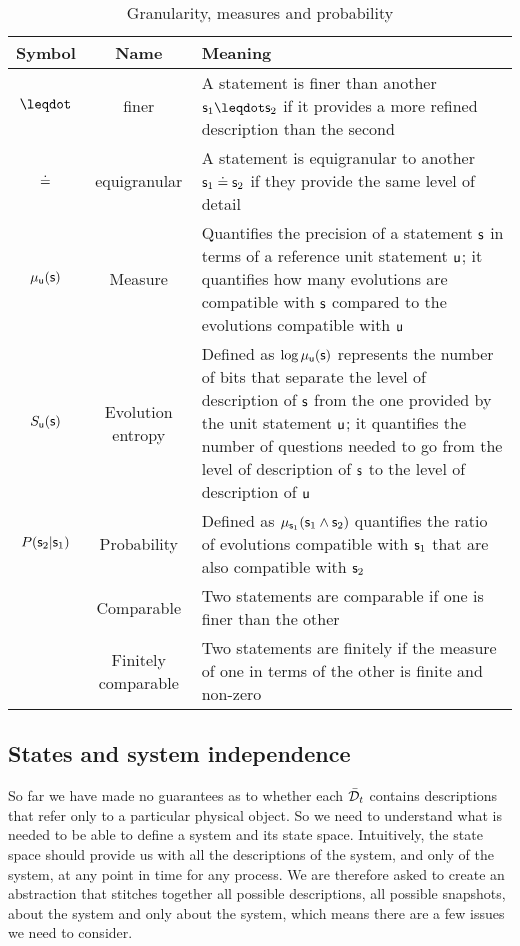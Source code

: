 \documentclass[letterpaper]{article}
\begin{document}
\begin{table}[h!]
	\centering
	\begin{tabular}[h]{|c|c|p{6cm}|}
		\hline 
		Symbol & Name & Meaning \\ 
		\hline 
		$\finer$ & finer & A statement is finer than another $\stmt_1 \finer \stmt_2$ if it provides a more refined description than the second \\ 
		\hline 
		$\eqgran$ & equigranular & A statement is equigranular to another $\stmt_1 \eqgran \stmt_2$ if they provide the same level of detail \\ 
		\hline 
		$\mu_{\stmt[u]}(\stmt)$ & Measure & Quantifies the precision of a statement $\stmt$ in terms of a reference unit statement $\stmt[u]$; it quantifies how many evolutions are compatible with $\stmt$ compared to the evolutions compatible with $\stmt[u]$  \\ 
		\hline 
		$S_{\stmt[u]}(\stmt)$ & Evolution entropy & Defined as $\log \mu_{\stmt[u]}(\stmt)$ represents the number of bits that separate the level of description of $\stmt$ from the one provided by the unit statement $\stmt[u]$; it quantifies the number of questions needed to go from the level of description of $\stmt$ to the level of description of $\stmt[u]$  \\ 
		\hline 
		$P(\stmt_2 | \stmt_1)$ & Probability & Defined as $\mu_{\stmt_1}(\stmt_1 \AND \stmt_2)$ quantifies the ratio of evolutions compatible with $\stmt_1$ that are also compatible with $\stmt_2$  \\ 
		\hline 
		 & Comparable & Two statements are comparable if one is finer than the other \\ 
		\hline 
		 & Finitely comparable & Two statements are finitely if the measure of one in terms of the other is finite and non-zero \\ 
		\hline 
	\end{tabular} 
	\caption{Granularity, measures and probability}
	\label{table:states}
\end{table}

\subsection{States and system independence}

So far we have made no guarantees as to whether each $\tdomain_t$ contains descriptions that refer only to a particular physical object. So we need to understand what is needed to be able to define a system and its state space. Intuitively, the state space should provide us with all the descriptions of the system, and only of the system, at any point in time for any process. We are therefore asked to create an abstraction that stitches together all possible descriptions, all possible snapshots, about the system and only about the system, which means there are a few issues we need to consider.
\end{document}
